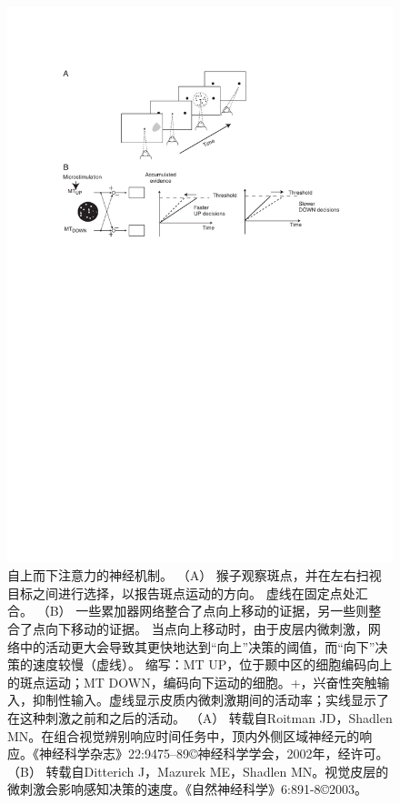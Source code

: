 \begin{figure}[!htb]
	\centering
	\includegraphics{chap3/3_5}
	\caption{自上而下注意力的神经机制。
		（A） 猴子观察斑点，并在左右扫视目标之间进行选择，以报告斑点运动的方向。
		虚线在固定点处汇合。
		（B） 一些累加器网络整合了点向上移动的证据，另一些则整合了点向下移动的证据。
		当点向上移动时，由于皮层内微刺激，网络中的活动更大会导致其更快地达到“向上”决策的阈值，而“向下”决策的速度较慢（虚线）。
		缩写：MT UP，位于颞中区的细胞编码向上的斑点运动；MT DOWN，编码向下运动的细胞。+，兴奋性突触输入，抑制性输入。虚线显示皮质内微刺激期间的活动率；实线显示了在这种刺激之前和之后的活动。
		（A） 转载自Roitman JD，Shadlen MN。在组合视觉辨别响应时间任务中，顶内外侧区域神经元的响应。《神经科学杂志》22:9475–89©神经科学学会，2002年，经许可。
		（B） 转载自Ditterich J，Mazurek ME，Shadlen MN。视觉皮层的微刺激会影响感知决策的速度。《自然神经科学》6:891-8©2003。}
	\label{fig:3_5}
\end{figure}


